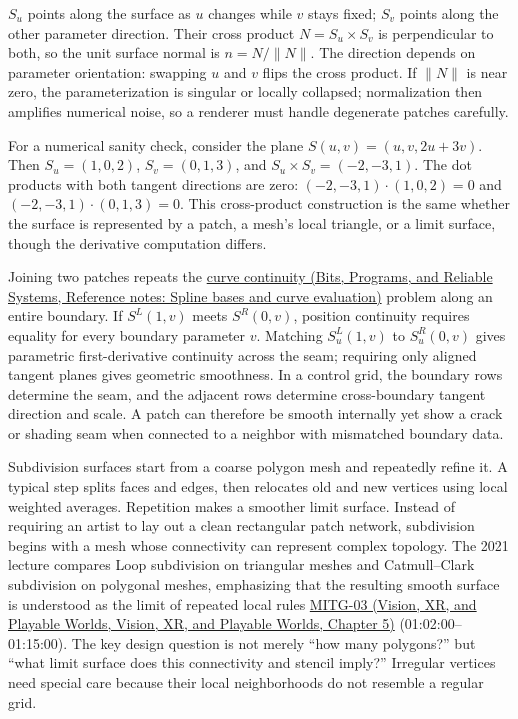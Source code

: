 \(S_u\) points along the surface as \(u\) changes while \(v\) stays fixed; \(S_v\) points along the other parameter direction. Their cross product \(N=S_u\times S_v\) is perpendicular to both, so the unit surface normal is \(n=N/\|N\|\). The direction depends on parameter orientation: swapping \(u\) and \(v\) flips the cross product. If \(\|N\|\) is near zero, the parameterization is singular or locally collapsed; normalization then amplifies numerical noise, so a renderer must handle degenerate patches carefully.

For a numerical sanity check, consider the plane \(S(u,v)=(u,v,2u+3v)\). Then \(S_u=(1,0,2)\), \(S_v=(0,1,3)\), and \(S_u\times S_v=(-2,-3,1)\). The dot products with both tangent directions are zero: \((-2,-3,1)\cdot(1,0,2)=0\) and \((-2,-3,1)\cdot(0,1,3)=0\). This cross-product construction is the same whether the surface is represented by a patch, a mesh's local triangle, or a limit surface, though the derivative computation differs.

Joining two patches repeats the \href{../01-Bits-Programs-and-Reliable-Systems/main.pdf\#nameddest=appendix-f28eeec97a3d}{curve continuity (Bits, Programs, and Reliable Systems, Reference notes: Spline bases and curve evaluation)} problem along an entire boundary. If \(S^L(1,v)\) meets \(S^R(0,v)\), position continuity requires equality for every boundary parameter \(v\). Matching \(S^L_u(1,v)\) to \(S^R_u(0,v)\) gives parametric first-derivative continuity across the seam; requiring only aligned tangent planes gives geometric smoothness. In a control grid, the boundary rows determine the seam, and the adjacent rows determine cross-boundary tangent direction and scale. A patch can therefore be smooth internally yet show a crack or shading seam when connected to a neighbor with mismatched boundary data.

Subdivision surfaces start from a coarse polygon mesh and repeatedly refine it. A typical step splits faces and edges, then relocates old and new vertices using local weighted averages. Repetition makes a smoother limit surface. Instead of requiring an artist to lay out a clean rectangular patch network, subdivision begins with a mesh whose connectivity can represent complex topology. The 2021 lecture compares Loop subdivision on triangular meshes and Catmull--Clark subdivision on polygonal meshes, emphasizing that the resulting smooth surface is understood as the limit of repeated local rules \href{../07-Vision-XR-and-Playable-Worlds/main.pdf\#nameddest=04-visual-computing-ii-ch036-mitg-03---curves-and-surfaces}{MITG-03 (Vision, XR, and Playable Worlds, Vision, XR, and Playable Worlds, Chapter 5)} (01:02:00--01:15:00). The key design question is not merely ``how many polygons?'' but ``what limit surface does this connectivity and stencil imply?'' Irregular vertices need special care because their local neighborhoods do not resemble a regular grid.

